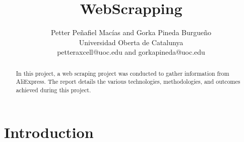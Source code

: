 \documentclass[a4paper]{article}
\title{WebScrapping}
\author{Petter Peñafiel Macías and Gorka Pineda Burgueño\\
  \small Universidad Oberta de Catalunya\\
  \small petteraxcell@uoc.edu and gorkapineda@uoc.edu\\
  \date{}
}
\begin{document}
\maketitle

\begin{abstract}
In this project, a web scraping project was conducted to gather information from AliExpress. The report details the various technologies, methodologies, and outcomes achieved during this project.
\end{abstract}

\section{Introduction}
\end{document}
